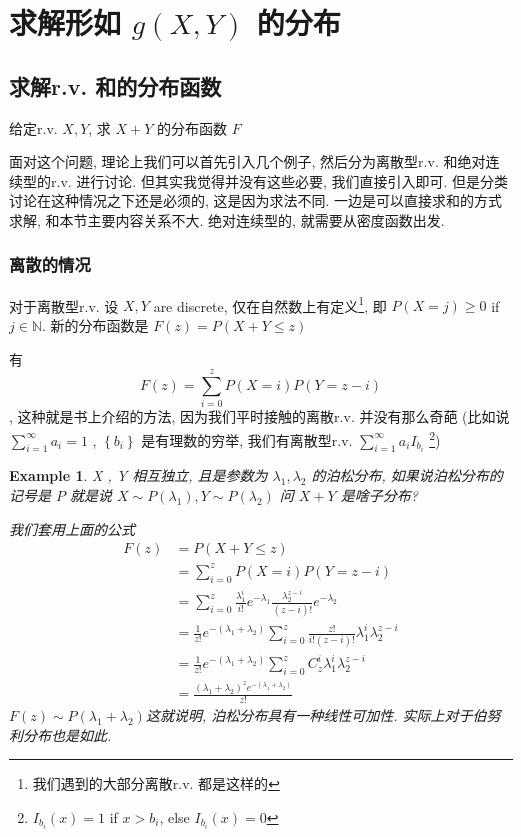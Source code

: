 \documentclass[a4paper, 10pt]{ctexart} %
\newtheorem{example}{Example}
\begin{document}
\section{求解形如 $g \left(X, Y\right)$ 的分布}
\subsection{求解r.v. 和的分布函数}
给定r.v. $X,  Y$, 求 $X + Y$ 的分布函数 $F$

面对这个问题, 理论上我们可以首先引入几个例子, 然后分为离散型r.v. 和绝对连续型的r.v. 进行讨论. 
但其实我觉得并没有这些必要, 我们直接引入即可. 
但是分类讨论在这种情况之下还是必须的, 这是因为求法不同. 一边是可以直接求和的方式求解, 和本节主要内容关系不大. 绝对连续型的, 就需要从密度函数出发.
\subsubsection{离散的情况}

对于离散型r.v. 设 $X, Y$ are discrete, 仅在自然数上有定义\footnote{我们遇到的大部分离散r.v. 都是这样的}, 即 $P\left(X = j\right) \ge  0 $ if $j \in \mathbb{N}$. 新的分布函数是 $F \left(z\right) = P\left(X + Y \le z\right)$ 

有 $$F \left(z\right) = \sum_{i = 0 } ^{ z} P \left(X = i\right) P\left(Y = z - i\right) $$, 这种就是书上介绍的方法, 因为我们平时接触的离散r.v. 并没有那么奇葩 (比如说 $\sum_{i =1} ^{\infty} a_i = 1$ , $\left\{b_i\right\}$ 是有理数的穷举, 我们有离散型r.v. $\sum_{i=1}  ^{\infty} a_i I _{b_i}$ \footnote{$I_{b_i} \left(x\right)= 1$ if $x > b_i$, else $I _{b_i} \left(x\right) = 0$})

\begin{example}
    X , Y 相互独立, 且是参数为 $\lambda_1 , \lambda_2$ 的泊松分布, 如果说泊松分布的记号是 $P$ 就是说 $X \sim P\left(\lambda_1\right), Y \sim P \left(\lambda_2\right)$
    问 $X + Y$ 是啥子分布?

    我们套用上面的公式 
    \[
    \begin{aligned}
        F (z) & = P \left(X  + Y \le z\right) \\
        & = \sum_{i=0} ^{z}  P \left(X = i\right)  P \left(Y = z - i\right)\\
        & = \sum_{i=0} ^{z} \frac{\lambda_1 ^{i}}{i !} e ^{ - \lambda_1}\frac{ \lambda _{2}^{ z-i} }{\left(z-i\right) !} e ^{- \lambda_2}\\
        & = \frac{1}{z !}e ^{- \left(\lambda_1 + \lambda_2\right)}\sum_{i=0} ^{z} \frac{z !}{ i! \left(z -i\right) ! } \lambda ^{i}_{1} \lambda_{2}^{z -i}\\
        & = \frac{1}{z !}e ^{- \left(\lambda_1 + \lambda_2\right)}\sum_{i=0} ^{z} C_{z}^{i} \lambda _{1 }^{i}  \lambda_{2}^{z-i}\\
        & = \frac{\left(\lambda_1 + \lambda_2\right)^{z}e ^{ - \left( \lambda_1 + \lambda_2\right)}}{z ! }  
    \end{aligned}
    \]
 $F (z) \sim P ( \lambda_1 + \lambda_2)$这就说明, 泊松分布具有一种线性可加性. 实际上对于伯努利分布也是如此.
\end{example}
\end{document}

